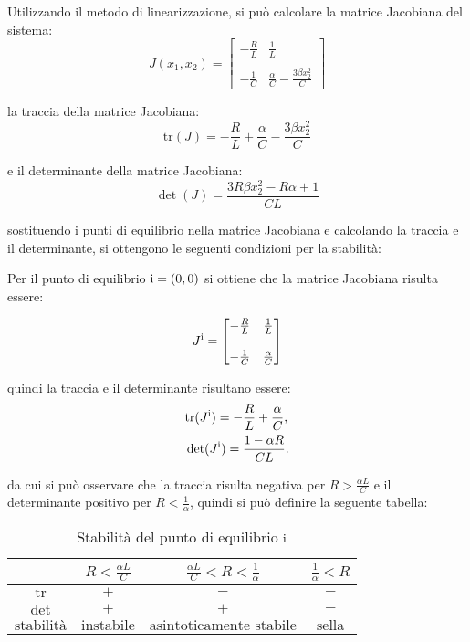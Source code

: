 \documentclass{article}
\newcommand{\rom}[1]{\uppercase\expandafter{\romannumeral #1\relax}}
\begin{document}
Utilizzando il metodo di linearizzazione, si può calcolare la matrice Jacobiana del sistema:
\[
    J(x_1, x_2) =
    \begin{bmatrix}
        -\frac{R}{L} & \frac{1}{L}                                \\\\
        -\frac{1}{C} & \frac{\alpha}{C} - \frac{3 \beta x_2^2}{C}
    \end{bmatrix}
\]

la traccia della matrice Jacobiana:
\[
    \text{tr}(J) = - \frac{R}{L} + \frac{\alpha}{C} - \frac{3 \beta x_2^2}{C}
\]

e il determinante della matrice Jacobiana:
\[
    \det(J) = \frac{3 R \beta x_2^2 - R \alpha + 1}{C L}
\]

sostituendo i punti di equilibrio nella matrice Jacobiana e calcolando la traccia e il determinante, si ottengono le seguenti condizioni per la stabilità:

Per il punto di equilibrio \(\text{\rom{1}} = (0, 0)\) si ottiene che la matrice Jacobiana risulta essere:

\[
    J^\text{\rom{1}} =
    \begin{bmatrix}
        -\frac{R}{L} & \frac{1}{L}      \\\\
        -\frac{1}{C} & \frac{\alpha}{C}
    \end{bmatrix}
\]

quindi la traccia e il determinante risultano essere:
\begin{align*}
     & \text{tr}(J^\text{\rom{1}}) = -\frac{R}{L} + \frac{\alpha}{C}, \\
     & \det(J^\text{\rom{1}})      = \frac{1 - \alpha R}{C L}.
\end{align*}

da cui si può osservare che la traccia risulta negativa per \(R > \frac{\alpha L}{C}\) e il determinante positivo per \(R < \frac{1}{\alpha}\), quindi si può definire la seguente tabella:

\begin{table}[h!]
    \centering
    \begin{tabular}{|c|c|c|c|}
        \hline
        $ $                & $R < \frac{\alpha L}{C}$ & $\frac{\alpha L}{C} < R < \frac{1}{\alpha}$ & $\frac{1}{\alpha} < R$ \\ \hline
        $\text{tr}$        & $+$                      & $-$                                         & $-$                    \\ \hline
        $\det$             & $+$                      & $+$                                         & $-$                    \\ \hline
        $\text{stabilità}$ & $\text{instabile}$       & $\text{asintoticamente stabile}$            & $\text{sella}$         \\ \hline
    \end{tabular}
    \caption{Stabilità del punto di equilibrio \(\text{\rom{1}}\)}
\end{table}
\end{document}
